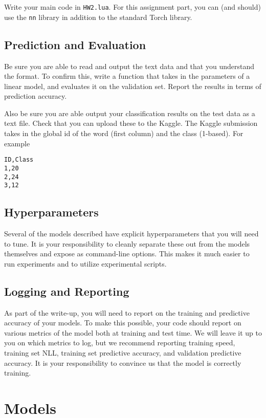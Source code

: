 \documentclass[11pt]{article}
\begin{document}
Write your main code in
\texttt{HW2.lua}. For this
assignment part, you can (and should) use the
\texttt{nn} library in addition to the standard Torch library.

\subsection{Prediction and Evaluation}

Be sure you are able to read and
output the text data and that you
understand the format. To confirm
this, write a function that takes in
the parameters of a linear model,
and evaluates it on the validation
set.  Report the results in terms of
prediction accuracy. 

Also be sure you are able output your classification results on the test data as 
a text file. Check that you can upload these to the Kaggle. The Kaggle submission
takes in the global id of the word (first column) and the class (1-based). For example

\begin{verbatim}
ID,Class
1,20
2,24
3,12
\end{verbatim}

\subsection{Hyperparameters}

Several of the models described have explicit hyperparameters that you will 
need to tune. It is your responsibility to cleanly separate these out from 
the models themselves and expose as command-line options. This makes it much 
easier to run experiments and to utilize experimental scripts. 

\subsection{Logging and Reporting}

As part of the write-up, you will need to report on the training and
predictive accuracy of your models. To make this possible, your code
should report on various metrics of the model both at training and
test time. We will leave it up to you on which metrics to log, but we
recommend reporting training speed, training set NLL, training set
predictive accuracy, and validation predictive accuracy. It is your
responsibility to convince us that the model is correctly training.

\section{Models}
\end{document}
